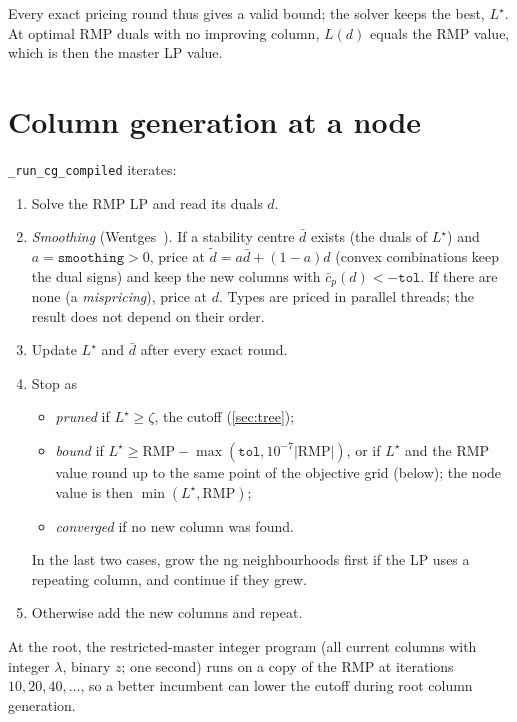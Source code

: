 \documentclass[11pt,a4paper]{article}
\theoremstyle{definition}
\theoremstyle{remark}
\newcommand{\code}[1]{\texttt{#1}}
\newcommand{\rc}{\bar c}
\newcommand{\RMP}{\mathrm{RMP}}
\begin{document}
Every exact pricing round thus gives a valid bound; the solver keeps the best,
$L^\star$. At optimal $\RMP$ duals with no improving column, $L(d)$ equals the
$\RMP$ value, which is then the master LP value.

\section{Column generation at a node}\label{sec:cg}

\code{\_run\_cg\_compiled} iterates:
\begin{enumerate}[leftmargin=*]
\item Solve the $\RMP$ LP and read its duals $d$.
\item \emph{Smoothing} (Wentges~\cite{wentges1997}). If a stability centre
  $\bar d$ exists (the duals of $L^\star$) and $a=\texttt{smoothing}>0$, price
  at $\tilde d=a\bar d+(1-a)d$ (convex combinations keep the dual signs) and
  keep the new columns with $\rc_p(d)<-\texttt{tol}$. If there are none (a
  \emph{mispricing}), price at $d$. Types are priced in parallel threads; the
  result does not depend on their order.
\item Update $L^\star$ and $\bar d$ after every exact round.
\item Stop as
  \begin{itemize}[nosep]
  \item \emph{pruned} if $L^\star\ge\zeta$, the cutoff (\cref{sec:tree});
  \item \emph{bound} if $L^\star\ge\RMP-\max(\texttt{tol},10^{-7}|\RMP|)$, or if
    $L^\star$ and the $\RMP$ value round up to the same point of the objective
    grid (below); the node value is then $\min(L^\star,\RMP)$;
  \item \emph{converged} if no new column was found.
  \end{itemize}
  In the last two cases, grow the ng neighbourhoods first if the LP uses a
  repeating column, and continue if they grew.
\item Otherwise add the new columns and repeat.
\end{enumerate}
At the root, the restricted-master integer program (all current columns with
integer $\lambda$, binary $z$; one second) runs on a copy of the $\RMP$ at
iterations $10,20,40,\dots$, so a better incumbent can lower the cutoff during
root column generation.
\end{document}
